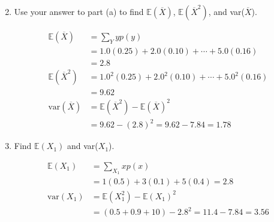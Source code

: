 \begin{enumerate}[label=(\alph*)]
\begin{mdframed}
\begin{multicols}{2}
            \end{multicols}
        \end{mdframed}

        \item Use your answer to part (a) to find $\mathbb{E}(\overline{X})$, $\mathbb{E}(\overline{X}^{2})$, and var($\overline{X}$).
        \\
        \begin{mdframed}
            \begin{align*}
                \mathbb{E}(\overline{X})        & = \sum_{Y}yp(y)   \\
                                                & = 1.0(0.25) + 2.0(0.10) + \cdots + 5.0(0.16)  \\
                                                & = \boxed{2.8}                               \\
                \mathbb{E}(\overline{X}^{2})    & = 1.0^{2}(0.25) + 2.0^{2}(0.10) + \cdots + 5.0^{2}(0.16)\\
                                                & = \boxed{9.62}            \\
                \text{var}(\overline{X})        & = \mathbb{E}(\overline{X}^{2}) - \mathbb{E}(\overline{X})^{2} \\
                                                & = 9.62 - (2.8)^{2} = 9.62 - 7.84 = \boxed{1.78}
            \end{align*}
        \end{mdframed}

        \pagebreak

        \item Find $\mathbb{E}(X_{1})$ and var($X_{1}$).
        \\
        \begin{mdframed}
            \begin{align*}
                \mathbb{E}(X_{1})   & = \sum_{X_{1}}xp(x)                               \\
                                    & = 1(0.5) + 3(0.1) + 5(0.4) = \boxed{2.8}          \\
                \text{var}(X_{1})   & = \mathbb{E}(X_{1}^{2}) - \mathbb{E}(X_{1})^{2}   \\
                                    & = (0.5 + 0.9 + 10) - 2.8^{2} = 11.4 - 7.84 = \boxed{3.56}
            \end{align*}
        \end{mdframed}


\end{enumerate}
